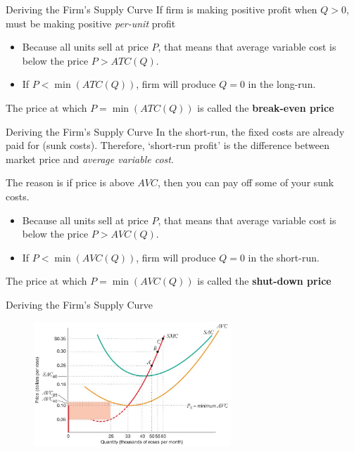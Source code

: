 \documentclass[11pt,t]{beamer}
\begin{document}
\begin{frame}{Deriving the Firm's Supply Curve}
  If firm is making positive profit when $Q > 0$, must be making positive \textit{per-unit} profit

  \begin{itemize}
    \item Because all units sell at price $P$, that means that average variable cost is below the price $P > ATC(Q)$.
    
    \item If $P < \min(ATC(Q))$, firm will produce $Q=0$ in the long-run. 
  \end{itemize}
  
  \bigskip\pause
  The price at which $P = \min(ATC(Q))$ is called the \textbf{break-even price}
\end{frame}

\begin{frame}{Deriving the Firm's Supply Curve}
  In the short-run, the fixed costs are already paid for (sunk costs). Therefore, `short-run profit' is the difference between market price and \emph{average variable cost}. 

  The reason is if price is above $AVC$, then you can pay off some of your sunk costs. 

  \begin{itemize}
    \item Because all units sell at price $P$, that means that average variable cost is below the price $P > AVC(Q)$.
    
    \item If $P < \min(AVC(Q))$, firm will produce $Q=0$ in the short-run.
  \end{itemize}
  
  \bigskip\pause
  The price at which $P = \min(AVC(Q))$ is called the \textbf{shut-down price}
\end{frame}

\begin{frame}{Deriving the Firm's Supply Curve}
  \begin{figure}
    \includegraphics[width=280px]{figures/fig9_2.jpg}
  \end{figure}
\end{frame}
\end{document}
